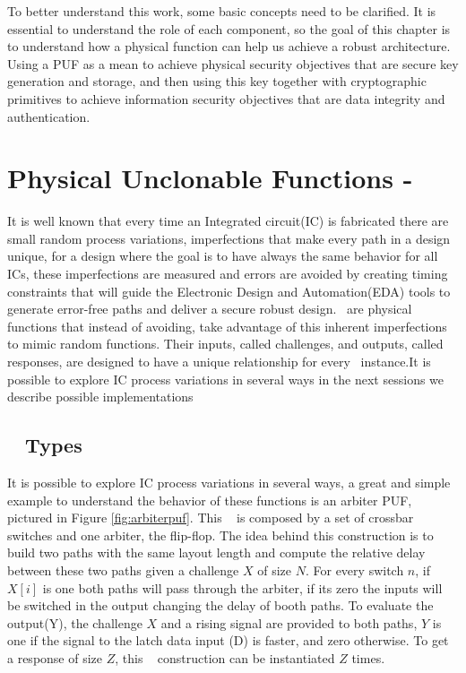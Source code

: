 
To better understand this work, some basic concepts need to be clarified. It is essential to understand the role of each component, so the goal of this chapter is to understand how a physical function can help us achieve a robust architecture. Using a PUF as a mean to achieve physical security objectives that are secure key generation and storage,  and then using this key together with cryptographic primitives to achieve information security objectives that are data integrity and authentication. 



\section{Physical Unclonable Functions - \pufs~}
\label{sec:pufs}
It is well known that every time an Integrated circuit(IC) is fabricated there are small random process variations, imperfections that make every path in a design unique, for a design where the goal is to have always the same behavior for all ICs, these imperfections are measured and errors are avoided by creating timing constraints that will guide the Electronic Design and Automation(EDA) tools to  generate error-free paths and deliver a \rm{secure} robust design. \pufs~are physical functions that instead of avoiding, take advantage of this inherent imperfections to mimic random functions. Their inputs, called challenges, and outputs, called responses, are designed to have a unique relationship for every \puf~instance.It is possible to explore IC process variations in several ways\cite{DBLP:phdbasesearchMaes12} in the next sessions we describe  possible implementations%

\subsection{\puf~ Types}
It is possible to explore IC process variations in several ways, a great and simple example to understand the behavior of these functions is an arbiter PUF, pictured in Figure \ref{fig:arbiterpuf}.
This \puf~ is composed by a set of crossbar switches and one arbiter, the flip-flop. The idea behind this construction is to build two paths with the same layout length and compute the relative delay between these two paths given a challenge $X$ of size $N$.  For every switch $n$, if $X[i]$  is one both paths will pass through the arbiter, if its zero the inputs will be switched in the output changing the delay of booth paths. To evaluate the output(Y), the challenge $X$ and a rising signal are provided to both paths, $Y$ is one if the signal to the latch data input (D) is faster, and zero otherwise. To get a response of size $Z$, this \puf~ construction  can be instantiated $Z$ times.

